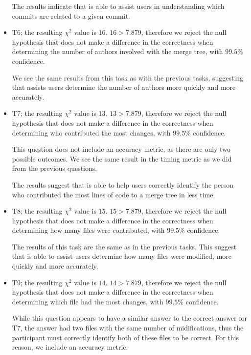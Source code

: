\documentclass[draft]{IEEEtran}
\begin{document}
\begin{itemize}
    The results indicate that \tool is able to assist users in
    understanding which commits are related to a given commit.

  \item

    T6; the resulting $\chi^2$ value is $16$. $16 > 7.879$, therefore we
    reject the null hypothesis that \tool does not make a difference in
    the correctness when determining the number of authors involved with
    the merge tree, with $99.5\%$ confidence.

    We see the same results from this task as with the previous tasks,
    suggesting that \tool assists users determine the number of authors
    more quickly and more accurately.

  \item

    T7; the resulting $\chi^2$ value is $13$. $13 > 7.879$, therefore we
    reject the null hypothesis that \tool does not make a difference in
    the correctness when determining who contributed the most changes,
    with $99.5\%$ confidence.

    This question does not include an accuracy metric, as there are only
    two possible outcomes. We see the same result in the timing metric
    as we did from the previous questions.

    The results suggest that \tool is able to help users correctly
    identify the person who contributed the most lines of code to a
    merge tree in less time.

  \item

    T8; the resulting $\chi^2$ value is $15$. $15 > 7.879$, therefore we
    reject the null hypothesis that \tool does not make a difference in
    the correctness when determining how many files were contributed,
    with $99.5\%$ confidence.

    The results of this task are the same as in the previous tasks.
    This suggest that \tool is able to assist users determine how many
    files were modified, more quickly and more accurately.

  \item

    T9; the resulting $\chi^2$ value is $14$. $14 > 7.879$, therefore we
    reject the null hypothesis that \tool does not make a difference in
    the correctness when determining which file had the most changes,
    with $99.5\%$ confidence.

    While this question appears to have a similar answer to the correct
    answer for T7, the answer \comA had two files with the same number
    of midifications, thus the participant must correctly identify both
    of these files to be correct. For this reason, we include an
    accuracy metric.


\end{itemize}
\end{document}
